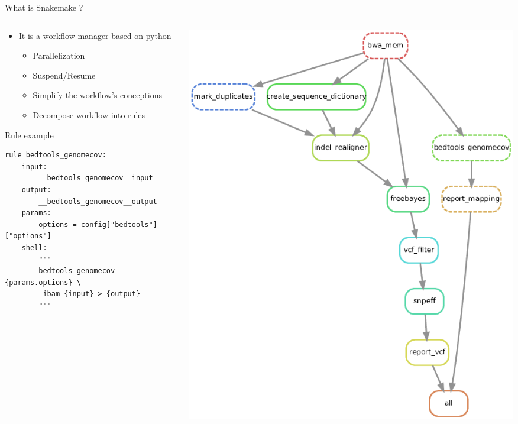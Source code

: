 \documentclass{beamer}
\begin{document}
\begin{frame}[fragile]{What is Snakemake ?}
    \begin{columns}
    \begin{column}{0.6\textwidth}
    \begin{itemize}
        \item It is a workflow manager based on python
        \begin{itemize}
            \item Parallelization
            \item Suspend/Resume
            \item Simplify the workflow's conceptions
            \item Decompose workflow into rules
        \end{itemize}
    \end{itemize}
    \begin{block}{Rule example}
    \begin{lstlisting}
rule bedtools_genomecov:
    input:
        __bedtools_genomecov__input
    output:
        __bedtools_genomecov__output
    params:
        options = config["bedtools"]["options"]
    shell:
        """
        bedtools genomecov {params.options} \
        -ibam {input} > {output}
        """ 
    \end{lstlisting}
    \end{block}
    \end{column}
    \begin{column}{0.4\textwidth}
        \includegraphics[scale=0.21]{images/variant_calling_dag}
    \end{column}
    \end{columns}
\end{frame}
\end{document}
